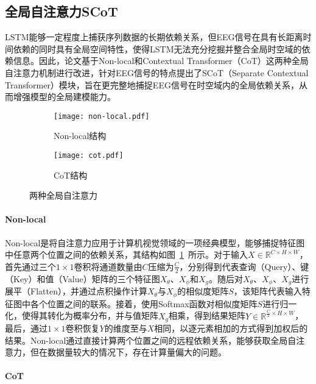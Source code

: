 \subsection{全局自注意力SCoT}

LSTM能够一定程度上捕获序列数据的长期依赖关系，但EEG信号在具有长距离时间依赖的同时具有全局空间特性，使得LSTM无法充分挖掘并整合全局时空域的依赖信息。因此，论文基于Non-local\cite{wang2018non}和Contextual Transformer（CoT）\cite{li2022contextual}这两种全局自注意力机制进行改进，针对EEG信号的特点提出了SCoT（Separate Contextual Transformer）模块，旨在更完整地捕捉EEG信号在时空域内的全局依赖关系，从而增强模型的全局建模能力。
\begin{figure}[h]
    \centering
    \begin{subfigure}{0.4\textwidth}
      \texttt{[image: non-local.pdf]}
      \caption{Non-local结构\cite{wang2018non}}
      \label{fig:non-local}
    \end{subfigure}\qquad
    \begin{subfigure}{0.4\textwidth}
      \texttt{[image: cot.pdf]}
      \caption{CoT结构\cite{li2022contextual}}
      \label{fig:cot}
    \end{subfigure}
    \caption{两种全局自注意力}
    \label{fig:self}
\end{figure}

\paragraph{Non-local}

Non-local是将自注意力\cite{vaswani2017attention}应用于计算机视觉领域的一项经典模型，能够捕捉特征图中任意两个位置之间的依赖关系，其结构如图~\ref{fig:non-local}~所示。对于输入\(X \in \mathbb{R}^{C \times H \times W}\)，首先通过三个\(1\times1\)卷积将通道数量由\(C\)压缩为\(\frac{C}{2}\)，分别得到代表查询（Query）、键（Key）和值（Value）矩阵的三个特征图\(X_\theta\)、\(X_\phi\)和\(X_g\)。随后对\(X_\theta\)、\(X_\phi\)、\(X_g\)进行展平（Flatten），并通过点积操作计算\(X_\theta\)与\(X_\phi\)的相似度矩阵\(S\)，该矩阵代表输入特征图中各个位置之间的联系。接着，使用Softmax函数对相似度矩阵\(S\)进行归一化，使得其转化为概率分布，并与值矩阵\(X_g\)相乘，得到结果矩阵\(Y \in \mathbb{R}^{\frac{C}{2} \times H \times W}\)，最后，通过\(1\times1\)卷积恢复\(Y\)的维度至与\(X\)相同，以逐元素相加的方式得到加权后的结果。Non-local通过直接计算两个位置之间的远程依赖关系，能够获取全局自注意力，但在数据量较大的情况下，存在计算量偏大的问题。

\paragraph{CoT}


